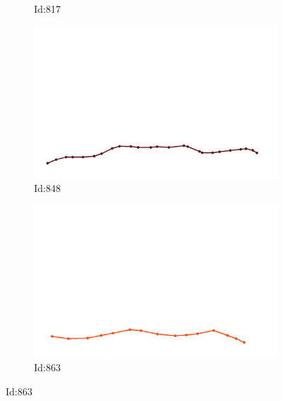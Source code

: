\documentclass[12pt,twoside]{report}
\begin{document}
\begin{figure}
\begin{subfigure}[b]{0.20\textwidth}
\caption{Id:817}
\end{subfigure}
\begin{subfigure}[b]{0.20\textwidth}
\centering
\includegraphics[width=\textwidth]{../trajectories/848.png}
\caption{Id:848}
\end{subfigure}
\begin{subfigure}[b]{0.20\textwidth}
\centering
\includegraphics[width=\textwidth]{../trajectories/863.png}
\caption{Id:863}
\end{subfigure}
\end{figure}
\end{document}
